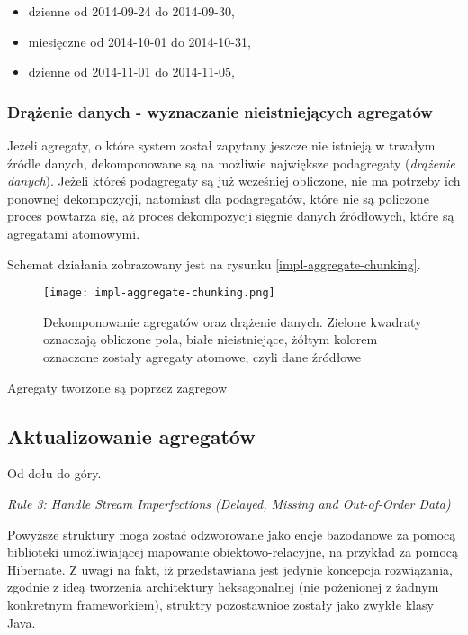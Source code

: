 \begin{itemize}[noitemsep]
  \item dzienne od 2014-09-24 do 2014-09-30,
  \item miesięczne od 2014-10-01 do 2014-10-31,
  \item dzienne od 2014-11-01 do 2014-11-05,
\end{itemize}

\subsubsection{Drążenie danych - wyznaczanie nieistniejących agregatów}

Jeżeli agregaty, o które system został zapytany jeszcze nie istnieją w trwałym źródle danych, dekomponowane są na możliwie największe podagregaty (\emph{drążenie danych}). Jeżeli któreś podagregaty są już wcześniej obliczone, nie ma potrzeby ich ponownej dekompozycji, natomiast dla podagregatów, które nie są policzone proces powtarza się, aż proces dekompozycji sięgnie danych źródłowych, które są agregatami atomowymi.

Schemat działania zobrazowany jest na rysunku \ref{impl-aggregate-chunking}.

\begin{figure}[h!]
  \centering
    \texttt{[image: impl-aggregate-chunking.png]}
  \caption{Dekomponowanie agregatów oraz drążenie danych. Zielone kwadraty oznaczają obliczone pola, białe nieistniejące, żółtym kolorem oznaczone zostały agregaty atomowe, czyli dane źródłowe}
  \label{fig:impl-aggregate-chunking}
\end{figure}

Agregaty tworzone są poprzez zagregow

\subsection{Aktualizowanie agregatów}

Od dołu do góry.

\emph{Rule 3: Handle Stream Imperfections (Delayed, Missing and Out-of-Order Data)} \cite{stream-processing-streamsql}

Powyższe struktury moga zostać odzworowane jako encje bazodanowe za pomocą biblioteki umożliwiającej mapowanie obiektowo-relacyjne, na przykład za pomocą Hibernate. Z uwagi na fakt, iż przedstawiana jest jedynie koncepcja rozwiązania, zgodnie z ideą tworzenia architektury heksagonalnej (nie pożenionej z żadnym konkretnym frameworkiem), struktry pozostawnioe zostały jako zwykłe klasy Java.
